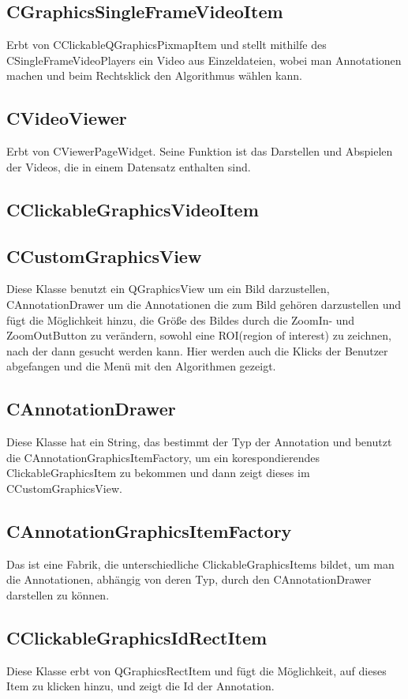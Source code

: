 \subsection*{CGraphicsSingleFrameVideoItem}
Erbt von CClickableQGraphicsPixmapItem und stellt mithilfe des CSingleFrameVideoPlayers ein Video aus Einzeldateien, wobei man Annotationen machen und beim Rechtsklick den Algorithmus wählen kann.

\subsection*{CVideoViewer}
Erbt von CViewerPageWidget. Seine Funktion ist das Darstellen und Abspielen der Videos, die in einem Datensatz enthalten sind.

\subsection*{CClickableGraphicsVideoItem}


\subsection*{CCustomGraphicsView}
Diese Klasse benutzt ein QGraphicsView um ein Bild darzustellen, CAnnotationDrawer um die Annotationen die zum Bild gehören darzustellen und fügt die Möglichkeit hinzu, die Größe des Bildes durch die ZoomIn- und ZoomOutButton zu verändern, sowohl eine ROI(region of interest) zu zeichnen, nach der dann gesucht werden kann. Hier werden auch die Klicks der Benutzer abgefangen und die Menü mit den Algorithmen gezeigt.  

\subsection*{CAnnotationDrawer}
Diese Klasse hat ein String, das bestimmt der Typ der Annotation und benutzt die CAnnotationGraphicsItemFactory, um ein korespondierendes ClickableGraphicsItem zu bekommen und dann zeigt dieses im CCustomGraphicsView.
  
\subsection*{CAnnotationGraphicsItemFactory}
Das ist eine Fabrik, die unterschiedliche ClickableGraphicsItems bildet, um man die Annotationen, abhängig von deren Typ, durch den CAnnotationDrawer  darstellen zu können.

\subsection*{CClickableGraphicsIdRectItem}
Diese Klasse erbt von QGraphicsRectItem und fügt die Möglichkeit, auf dieses Item zu klicken hinzu, und zeigt die Id der Annotation.
 
